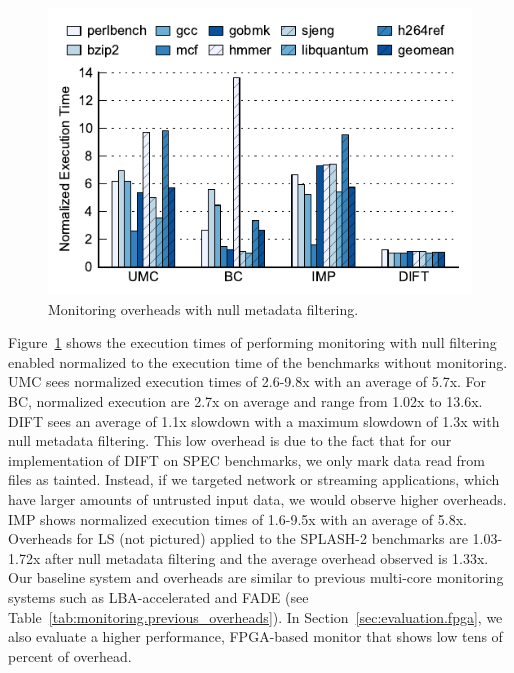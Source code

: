 \begin{figure}
  \begin{center}
    \includegraphics[width=\columnwidth]{figs/data_filtering.pdf}
    \vspace{-0.2in}
    \caption{Monitoring overheads with null metadata filtering.}
    \label{fig:evaluation.filtering}
    \vspace{-0.1in}
  \end{center}
\end{figure}

Figure~\ref{fig:evaluation.filtering} shows the
execution times of performing monitoring with null filtering enabled normalized
to the execution time of the benchmarks without monitoring. UMC sees normalized
execution times of 2.6-9.8x with an average of 5.7x.
For BC, normalized execution
are 2.7x on average and range from 1.02x to 13.6x.
DIFT sees an average of 1.1x slowdown with a maximum slowdown of 1.3x with null
metadata filtering. This low overhead is due to the fact
that for our implementation of DIFT on SPEC
benchmarks, we only mark data read from files as tainted. Instead, if we
targeted network or streaming applications, which have larger amounts of
untrusted input data, we would observe higher overheads. IMP shows normalized
execution times of 1.6-9.5x with an average of 5.8x. Overheads for LS (not pictured)
applied to the SPLASH-2 benchmarks are
1.03-1.72x after null metadata filtering and the average
overhead observed is 1.33x.
Our baseline system and overheads are similar to previous multi-core
monitoring systems such as LBA-accelerated \cite{lba-isca08} and FADE
\cite{fade-hpca14} (see
Table~\ref{tab:monitoring.previous_overheads}). In
Section~\ref{sec:evaluation.fpga}, we also evaluate a higher performance, FPGA-based
monitor that shows low tens of percent of overhead. 

